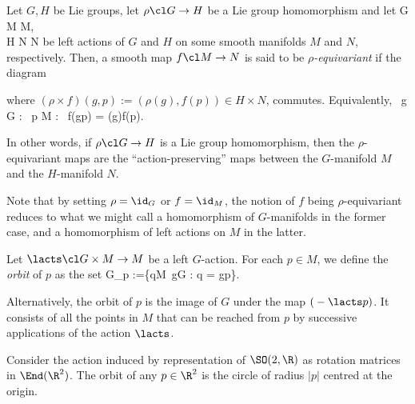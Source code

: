 \bd
Let $G,H$ be Lie groups, let $\rho\cl G\to H$ be a Lie group homomorphism and let
\lacts \cl G \times M \to M,\\
\blacktriangleright \cl H \times N \to N
\ei
be left actions of $G$ and $H$ on some smooth manifolds $M$ and $N$, respectively. Then, a smooth map $f\cl M\to N$ is said to be \emph{$\rho$-equivariant} if the diagram
\bse
{}
\ese
where $(\rho\times f)(g,p) := (\rho(g),f(p))\in H\times N$, commutes. Equivalently,
\bse
\forall \, g \in G : \forall \, p \in M : \ f(g\lacts p) = \rho(g)\blacktriangleright f(p).
\ese
\ed

In other words, if $\rho\cl G \to H$ is a Lie group homomorphism, then the $\rho$-equivariant maps are the ``action-preserving'' maps between the $G$-manifold $M$ and the $H$-manifold $N$.

\br
Note that by setting $\rho = \id_G$ or $f=\id_M$, the notion of $f$ being $\rho$-equivariant reduces to what we might call a homomorphism of $G$-manifolds in the former case, and a homomorphism of left actions on $M$ in the latter.
\er

\bd
Let $\lacts \cl G \times M \to M$ be a left $G$-action. For each $p\in M$, we define the \emph{orbit} of $p$ as the set
\bse
G_p :=\{q\in M\mid \exists \, g\in G : q = g\lacts p\}.
\ese
\ed

Alternatively, the orbit of $p$ is the image of $G$ under the map $( {}-\lacts p)$. It consists of all the points in $M$ that can be reached from $p$ by successive applications of the action $\lacts$.

\be
Consider the action induced by representation of $\SO(2,\R)$ as rotation matrices in $\End(\R^2)$. The orbit of any $p\in\R^2$ is the circle of radius $|p|$ centred at the origin.
\begin{center}
\end{center}
\ee

